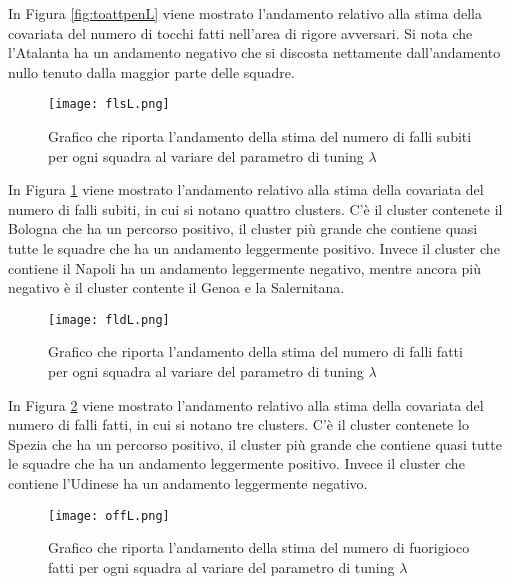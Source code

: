 In Figura \ref{fig:toattpenL} viene mostrato l'andamento relativo alla stima della covariata del numero di tocchi fatti nell'area di rigore avversari. Si nota che l'Atalanta ha un andamento negativo che si discosta nettamente dall'andamento nullo tenuto dalla maggior parte delle squadre.

\begin{figure}[htbp]
	\begin{center}
		\texttt{[image: flsL.png]}
		\caption{Grafico che riporta l'andamento della stima del numero di falli subiti per ogni squadra al variare del parametro di tuning $\lambda$} \label{fig:flsL}
	\end{center}
\end{figure}

In Figura \ref{fig:flsL} viene mostrato l'andamento relativo alla stima della covariata del numero di falli subiti, in cui si notano quattro clusters. C'è il cluster contenete il Bologna che ha un percorso positivo, il cluster più grande che contiene quasi tutte le squadre che ha un andamento leggermente positivo. Invece il cluster che contiene il Napoli ha un andamento leggermente negativo, mentre ancora più negativo è il cluster contente il Genoa e la Salernitana.

\begin{figure}[htbp]
	\begin{center}
		\texttt{[image: fldL.png]}
		\caption{Grafico che riporta l'andamento della stima del numero di falli fatti per ogni squadra al variare del parametro di tuning $\lambda$} \label{fig:fldL}
	\end{center}
\end{figure}

In Figura \ref{fig:fldL} viene mostrato l'andamento relativo alla stima della covariata del numero di falli fatti, in cui si notano tre clusters. C'è il cluster contenete lo Spezia che ha un percorso positivo, il cluster più grande che contiene quasi tutte le squadre che ha un andamento leggermente positivo. Invece il cluster che contiene l'Udinese ha un andamento leggermente negativo.

\begin{figure}[htbp]
	\begin{center}
		\texttt{[image: offL.png]}
		\caption{Grafico che riporta l'andamento della stima del numero di fuorigioco fatti per ogni squadra al variare del parametro di tuning $\lambda$} \label{fig:offL}
	\end{center}
\end{figure}

